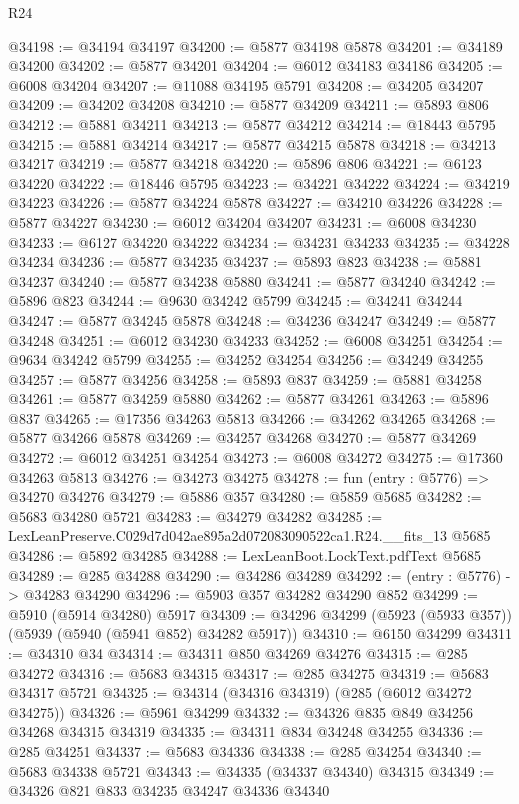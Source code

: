 \begin{lexlean}{R24}
\begin{coremodule}
@34198 := @34194 @34197
@34200 := @5877 @34198 @5878
@34201 := @34189 @34200
@34202 := @5877 @34201
@34204 := @6012 @34183 @34186
@34205 := @6008 @34204
@34207 := @11088 @34195 @5791
@34208 := @34205 @34207
@34209 := @34202 @34208
@34210 := @5877 @34209
@34211 := @5893 @806
@34212 := @5881 @34211
@34213 := @5877 @34212
@34214 := @18443 @5795
@34215 := @5881 @34214
@34217 := @5877 @34215 @5878
@34218 := @34213 @34217
@34219 := @5877 @34218
@34220 := @5896 @806
@34221 := @6123 @34220
@34222 := @18446 @5795
@34223 := @34221 @34222
@34224 := @34219 @34223
@34226 := @5877 @34224 @5878
@34227 := @34210 @34226
@34228 := @5877 @34227
@34230 := @6012 @34204 @34207
@34231 := @6008 @34230
@34233 := @6127 @34220 @34222
@34234 := @34231 @34233
@34235 := @34228 @34234
@34236 := @5877 @34235
@34237 := @5893 @823
@34238 := @5881 @34237
@34240 := @5877 @34238 @5880
@34241 := @5877 @34240
@34242 := @5896 @823
@34244 := @9630 @34242 @5799
@34245 := @34241 @34244
@34247 := @5877 @34245 @5878
@34248 := @34236 @34247
@34249 := @5877 @34248
@34251 := @6012 @34230 @34233
@34252 := @6008 @34251
@34254 := @9634 @34242 @5799
@34255 := @34252 @34254
@34256 := @34249 @34255
@34257 := @5877 @34256
@34258 := @5893 @837
@34259 := @5881 @34258
@34261 := @5877 @34259 @5880
@34262 := @5877 @34261
@34263 := @5896 @837
@34265 := @17356 @34263 @5813
@34266 := @34262 @34265
@34268 := @5877 @34266 @5878
@34269 := @34257 @34268
@34270 := @5877 @34269
@34272 := @6012 @34251 @34254
@34273 := @6008 @34272
@34275 := @17360 @34263 @5813
@34276 := @34273 @34275
@34278 := fun (entry : @5776) => @34270 @34276
@34279 := @5886 @357
@34280 := @5859 @5685
@34282 := @5683 @34280 @5721
@34283 := @34279 @34282
@34285 := LexLeanPreserve.C029d7d042ae895a2d072083090522ca1.R24.__fits_13 @5685
@34286 := @5892 @34285
@34288 := LexLeanBoot.LockText.pdfText @5685
@34289 := @285 @34288
@34290 := @34286 @34289
@34292 := (entry : @5776) -> @34283 @34290
@34296 := @5903 @357 @34282 @34290 @852
@34299 := @5910 (@5914 @34280) @5917
@34309 := @34296 @34299 (@5923 (@5933 @357)) (@5939 (@5940 (@5941 @852) @34282 @5917))
@34310 := @6150 @34299
@34311 := @34310 @34
@34314 := @34311 @850 @34269 @34276
@34315 := @285 @34272
@34316 := @5683 @34315
@34317 := @285 @34275
@34319 := @5683 @34317 @5721
@34325 := @34314 (@34316 @34319) (@285 (@6012 @34272 @34275))
@34326 := @5961 @34299
@34332 := @34326 @835 @849 @34256 @34268 @34315 @34319
@34335 := @34311 @834 @34248 @34255
@34336 := @285 @34251
@34337 := @5683 @34336
@34338 := @285 @34254
@34340 := @5683 @34338 @5721
@34343 := @34335 (@34337 @34340) @34315
@34349 := @34326 @821 @833 @34235 @34247 @34336 @34340

\end{coremodule}
\end{lexlean}
